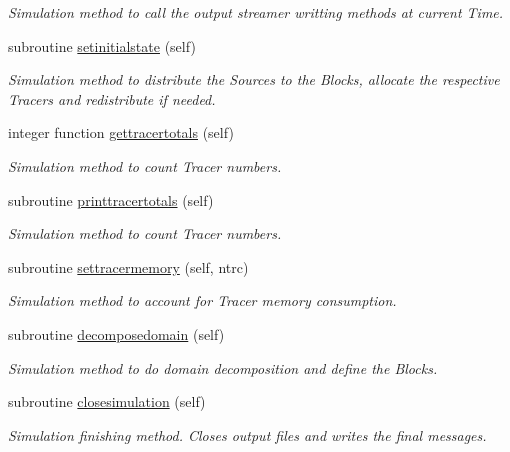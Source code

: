 \begin{DoxyCompactItemize}
\begin{DoxyCompactList}\small\item\em Simulation method to call the output streamer writting methods at current Time. \end{DoxyCompactList}\item 
subroutine \mbox{\hyperlink{namespacesimulation__mod_a447c6d709de6aa360a65d39d660e627b}{setinitialstate}} (self)
\begin{DoxyCompactList}\small\item\em Simulation method to distribute the Sources to the Blocks, allocate the respective Tracers and redistribute if needed. \end{DoxyCompactList}\item 
integer function \mbox{\hyperlink{namespacesimulation__mod_a0ad485eab624ffa4df282f1da8d9f214}{gettracertotals}} (self)
\begin{DoxyCompactList}\small\item\em Simulation method to count Tracer numbers. \end{DoxyCompactList}\item 
subroutine \mbox{\hyperlink{namespacesimulation__mod_aba126a8e0575cabb3bef6ab395002b3c}{printtracertotals}} (self)
\begin{DoxyCompactList}\small\item\em Simulation method to count Tracer numbers. \end{DoxyCompactList}\item 
subroutine \mbox{\hyperlink{namespacesimulation__mod_acc5fa823c8dd599de8feda8988c224f2}{settracermemory}} (self, ntrc)
\begin{DoxyCompactList}\small\item\em Simulation method to account for Tracer memory consumption. \end{DoxyCompactList}\item 
subroutine \mbox{\hyperlink{namespacesimulation__mod_a2b8198a9fb3f7671c6b45192a0b9740c}{decomposedomain}} (self)
\begin{DoxyCompactList}\small\item\em Simulation method to do domain decomposition and define the Blocks. \end{DoxyCompactList}\item 
subroutine \mbox{\hyperlink{namespacesimulation__mod_a4285722eaa589fa671233554b54c74f8}{closesimulation}} (self)
\begin{DoxyCompactList}\small\item\em Simulation finishing method. Closes output files and writes the final messages. \end{DoxyCompactList}\end{DoxyCompactItemize}


